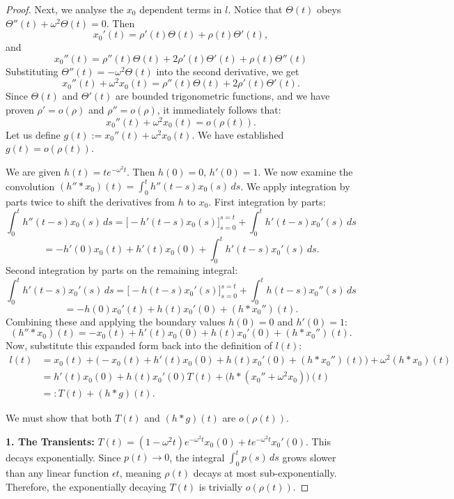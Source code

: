 \documentclass[10pt,reqno]{amsart}
\theoremstyle{definition}
\begin{document}
\begin{proof}
Next, we analyse the $x_0$ dependent terms in $l$. 
			Notice that $\Theta(t)$ obeys $\Theta''(t) + \omega^2 \Theta(t) = 0$. Then 
			\[ x_0'(t) = \rho'(t)\Theta(t) + \rho(t)\Theta'(t), \]
			and 
			\[ x_0''(t) = \rho''(t)\Theta(t) + 2\rho'(t)\Theta'(t) + \rho(t)\Theta''(t) \]
			Substituting $\Theta''(t) = -\omega^2 \Theta(t)$ into the second derivative, we get 
			\[ x_0''(t) + \omega^2 x_0(t) = \rho''(t)\Theta(t) + 2\rho'(t)\Theta'(t). \]
			Since $\Theta(t)$ and $\Theta'(t)$ are bounded trigonometric functions, and we have proven $\rho' = o(\rho)$ and $\rho'' = o(\rho)$, it immediately follows that:
			\[ x_0''(t) + \omega^2 x_0(t) = o(\rho(t)). \]
			Let us define $g(t) := x_0''(t) + \omega^2 x_0(t)$. We have established $g(t) = o(\rho(t))$.
				
			We are given $h(t) = t e^{-\omega^2 t}$. Then $h(0)=0$, $h'(0)=1$. We now examine the convolution $(h'' * x_0)(t) = \int_0^t h''(t-s)x_0(s)\,ds$. We apply integration by parts twice to shift the derivatives from $h$ to $x_0$. 
			First integration by parts:
			\[ \int_0^t h''(t-s)x_0(s)\,ds = \Big[ -h'(t-s)x_0(s) \Big]_{s=0}^{s=t} + \int_0^t h'(t-s)x_0'(s)\,ds \]
			\[ = -h'(0)x_0(t) + h'(t)x_0(0) + \int_0^t h'(t-s)x_0'(s)\,ds. \]
			Second integration by parts on the remaining integral:
			\[ \int_0^t h'(t-s)x_0'(s)\,ds = \Big[ -h(t-s)x_0'(s) \Big]_{s=0}^{s=t} + \int_0^t h(t-s)x_0''(s)\,ds \]
			\[ = -h(0)x_0'(t) + h(t)x_0'(0) + (h * x_0'')(t). \]
			Combining these and applying the boundary values $h(0) = 0$ and $h'(0) = 1$:
			\[ (h'' * x_0)(t) = -x_0(t) + h'(t)x_0(0) + h(t)x_0'(0) + (h * x_0'')(t). \]
			Now, substitute this expanded form back into the definition of $l(t)$:
			\begin{align*}
				l(t) &= x_0(t) + \Big( -x_0(t) + h'(t)x_0(0) + h(t)x_0'(0) + (h * x_0'')(t) \Big) + \omega^2 (h * x_0)(t) \\
				&= h'(t)x_0(0) + h(t)x_0'(0)T(t) + \Big( h * (x_0'' + \omega^2 x_0) \Big)(t) \\
				&=: T(t) + (h * g)(t).
			\end{align*}
			
			We must show that both $T(t)$ and $(h * g)(t)$ are $o(\rho(t))$. 
			
			\textbf{1. The Transients:} 
			$T(t) = (1-\omega^2 t)e^{-\omega^2 t}x_0(0) + t e^{-\omega^2 t}x_0'(0)$. This decays exponentially. Since $p(t) \to 0$, the integral $\int_0^t p(s)\,ds$ grows slower than any linear function $\epsilon t$, meaning $\rho(t)$ decays at most sub-exponentially. Therefore, the exponentially decaying $T(t)$ is trivially $o(\rho(t))$.
			

\end{proof}
\end{document}
